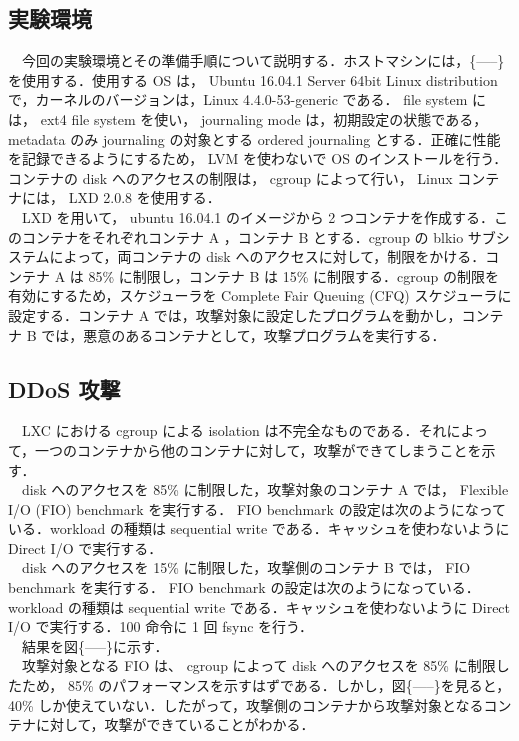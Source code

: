 \documentclass[graduation-thesis]{jsarticle}
\begin{document}
\subsection{実験環境}
　今回の実験環境とその準備手順について説明する．ホストマシンには，\{-----\}を使用する．使用する OS は， Ubuntu 16.04.1 Server 64bit Linux distribution で，カーネルのバージョンは，Linux 4.4.0-53-generic である． file system には， ext4 file system を使い， journaling mode は，初期設定の状態である， metadata のみ journaling の対象とする ordered journaling とする．正確に性能を記録できるようにするため， LVM を使わないで OS のインストールを行う．コンテナの disk へのアクセスの制限は， cgroup によって行い， Linux コンテナには， LXD 2.0.8 を使用する．\\
　LXD を用いて， ubuntu 16.04.1 のイメージから 2 つコンテナを作成する．このコンテナをそれぞれコンテナ A ，コンテナ B とする．cgroup の blkio サブシステムによって，両コンテナの disk へのアクセスに対して，制限をかける．コンテナ A は 85\% に制限し，コンテナ B は 15\% に制限する．cgroup の制限を有効にするため，スケジューラを Complete Fair Queuing (CFQ) スケジューラに設定する．コンテナ A では，攻撃対象に設定したプログラムを動かし，コンテナ B では，悪意のあるコンテナとして，攻撃プログラムを実行する．\\

\subsection{DDoS 攻撃}
　LXC における cgroup による isolation は不完全なものである．それによって，一つのコンテナから他のコンテナに対して，攻撃ができてしまうことを示す．\\
　disk へのアクセスを 85\% に制限した，攻撃対象のコンテナ A では， Flexible I/O (FIO) benchmark を実行する． FIO benchmark の設定は次のようになっている．workload の種類は sequential write である．キャッシュを使わないように Direct I/O で実行する．\\
　disk へのアクセスを 15\% に制限した，攻撃側のコンテナ B では， FIO benchmark を実行する． FIO benchmark の設定は次のようになっている． workload の種類は sequential write である．キャッシュを使わないように Direct I/O で実行する．100 命令に 1 回 fsync を行う．\\
　結果を図\{-----\}に示す．\\
　攻撃対象となる FIO は、 cgroup によって disk へのアクセスを 85\% に制限したため， 85\% のパフォーマンスを示すはずである．しかし，図\{-----\}を見ると， 40\% しか使えていない．したがって，攻撃側のコンテナから攻撃対象となるコンテナに対して，攻撃ができていることがわかる．\\
\end{document}
